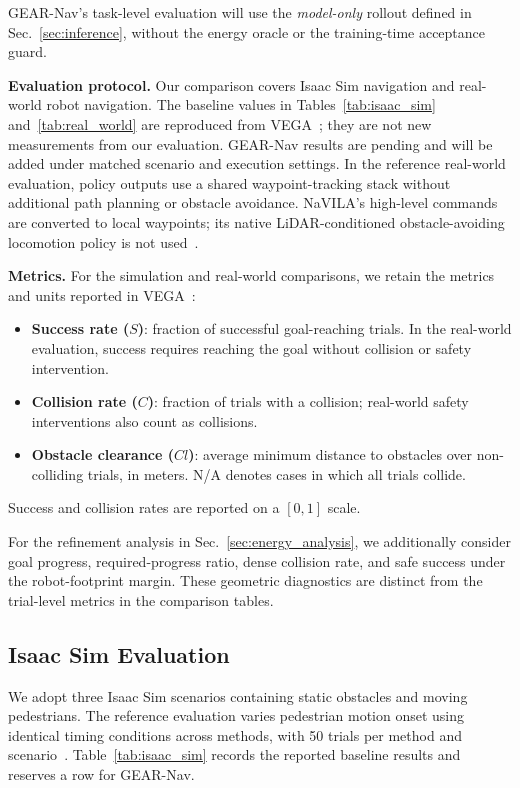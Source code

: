 \documentclass[letterpaper, 10 pt, conference]{ieeeconf}  %
\begin{document}
GEAR-Nav's task-level evaluation will use the \emph{model-only} rollout
defined in Sec.~\ref{sec:inference}, without the energy oracle or the
training-time acceptance guard.

\textbf{Evaluation protocol.}
Our comparison covers Isaac Sim navigation and real-world robot navigation.
The baseline values in Tables~\ref{tab:isaac_sim} and~\ref{tab:real_world}
are reproduced from VEGA~\cite{vega}; they are not new measurements from
our evaluation. GEAR-Nav results are pending and will be added under matched
scenario and execution settings. In the reference real-world evaluation,
policy outputs use a shared waypoint-tracking stack without additional path
planning or obstacle avoidance. NaVILA's high-level commands are converted
to local waypoints; its native LiDAR-conditioned obstacle-avoiding locomotion
policy is not used~\cite{vega}.

\textbf{Metrics.}
For the simulation and real-world comparisons, we retain the metrics and
units reported in VEGA~\cite{vega}:
\begin{itemize}
    \item \textbf{Success rate ($S$)}: fraction of successful goal-reaching
    trials. In the real-world evaluation, success requires reaching the goal
    without collision or safety intervention.
    \item \textbf{Collision rate ($C$)}: fraction of trials with a collision;
    real-world safety interventions also count as collisions.
    \item \textbf{Obstacle clearance ($Cl$)}: average minimum distance to
    obstacles over non-colliding trials, in meters. N/A denotes cases in
    which all trials collide.
\end{itemize}
Success and collision rates are reported on a $[0,1]$ scale.

For the refinement analysis in Sec.~\ref{sec:energy_analysis}, we additionally
consider goal progress, required-progress ratio, dense collision rate, and
safe success under the robot-footprint margin. These geometric diagnostics
are distinct from the trial-level metrics in the comparison tables.

\subsection{Isaac Sim Evaluation}
\label{sec:simulation}

We adopt three Isaac Sim scenarios containing static obstacles and moving
pedestrians. The reference evaluation varies pedestrian motion onset using
identical timing conditions across methods, with 50 trials per method and
scenario~\cite{vega}. Table~\ref{tab:isaac_sim} records the reported baseline
results and reserves a row for GEAR-Nav.
\end{document}
